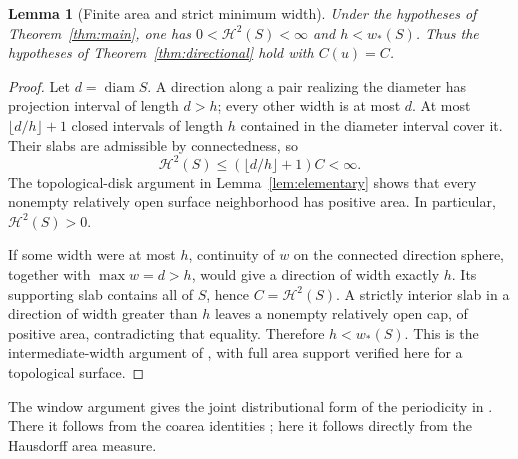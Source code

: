 \documentclass[11pt]{article}
\newtheorem{lemma}[theorem]{Lemma}
\newcommand{\HH}{\mathcal H}
\newcommand{\diam}{\operatorname{diam}}
\begin{document}
\begin{lemma}[Finite area and strict minimum width]\label{lem:originalreduction}
Under the hypotheses of Theorem~\ref{thm:main}, one has $0<\HH^2(S)<\infty$ and $h<w_*(S)$. Thus the hypotheses of Theorem~\ref{thm:directional} hold with $C(u)=C$.
\end{lemma}
\begin{proof}
Let $d=\diam S$. A direction along a pair realizing the diameter has projection interval of length $d>h$; every other width is at most $d$. At most $\lfloor d/h\rfloor+1$ closed intervals of length $h$ contained in the diameter interval cover it. Their slabs are admissible by connectedness, so
\[
 \HH^2(S)\le (\lfloor d/h\rfloor+1)C<\infty.
\]
The topological-disk argument in Lemma~\ref{lem:elementary} shows that every nonempty relatively open surface neighborhood has positive area. In particular, $\HH^2(S)>0$.

If some width were at most $h$, continuity of $w$ on the connected direction sphere, together with $\max w=d>h$, would give a direction of width exactly $h$. Its supporting slab contains all of $S$, hence $C=\HH^2(S)$. A strictly interior slab in a direction of width greater than $h$ leaves a nonempty relatively open cap, of positive area, contradicting that equality. Therefore $h<w_*(S)$. This is the intermediate-width argument of \cite[Note 1.3]{GHL}, with full area support verified here for a topological surface.
\end{proof}

The window argument gives the joint distributional form of the periodicity in \cite[equation (3), p.~5]{GHL}. There it follows from the coarea identities \cite[equations (1)--(2), p.~4]{GHL}; here it follows directly from the Hausdorff area measure.
\end{document}
